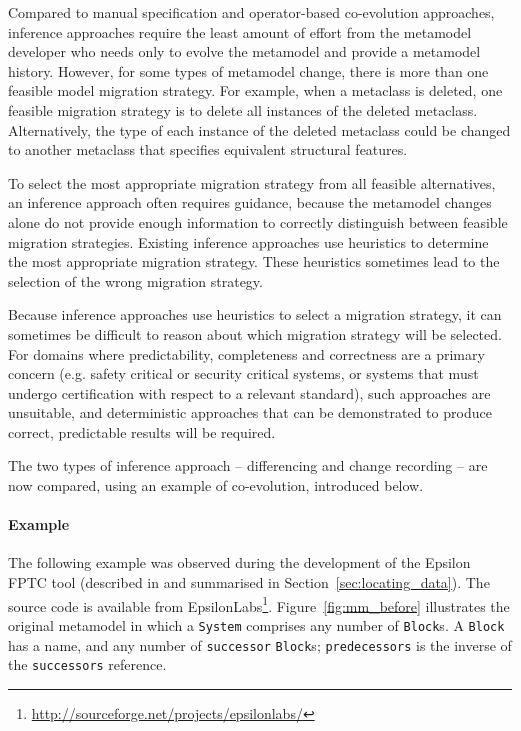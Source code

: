 Compared to manual specification and operator-based co-evolution approaches, inference approaches require the least amount of effort from the metamodel developer who needs only to evolve the metamodel and provide a metamodel history. However, for some types of metamodel change, there is more than one feasible model migration strategy. For example, when a metaclass is deleted, one feasible migration strategy is to delete all instances of the deleted metaclass. Alternatively, the type of each instance of the deleted metaclass could be changed to another metaclass that specifies equivalent structural features.

To select the most appropriate migration strategy from all feasible alternatives, an inference approach often requires guidance, because the metamodel changes alone do not provide enough information to correctly distinguish between feasible migration strategies. Existing inference approaches use heuristics to determine the most appropriate migration strategy. These heuristics sometimes lead to the selection of the wrong migration strategy.

Because inference approaches use heuristics to select a migration strategy, it can sometimes be difficult to reason about which migration strategy will be selected. For domains where predictability, completeness and correctness are a primary concern (e.g. safety critical or security critical systems, or systems that must undergo certification with respect to a relevant standard), such approaches are unsuitable, and deterministic approaches that can be demonstrated to produce correct, predictable results will be required. 

The two types of inference approach -- differencing and change recording -- are now compared, using an example of co-evolution, introduced below.

\paragraph{Example}
\label{subsubsec:example}
The following example was observed during the development of the Epsilon FPTC tool (described in \cite{paige08fptc} and summarised in Section~\ref{sec:locating_data}). The source code is available from EpsilonLabs\footnote{\url{http://sourceforge.net/projects/epsilonlabs/}}. Figure~\ref{fig:mm_before} illustrates the original metamodel in which a \texttt{System} comprises any number of \texttt{Block}s. A \texttt{Block} has a name, and any number of \texttt{successor} \texttt{Block}s; \texttt{predecessors} is the inverse of the \texttt{successors} reference.

